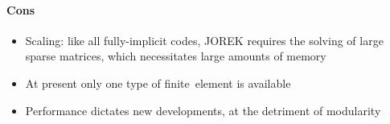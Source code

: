 \paragraph{Cons}

\begin{itemize}
  \item Scaling: like all fully-implicit codes, JOREK requires the solving of 
large sparse matrices, which necessitates large amounts of memory
  \item At present only one type of finite~element is available
  \item Performance dictates new developments, at the detriment of modularity
\end{itemize}


